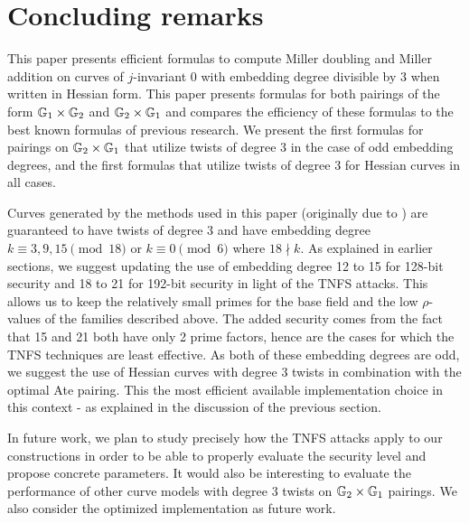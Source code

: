 \section{Concluding remarks}
\label{sec:conclude}

This paper presents efficient formulas to compute Miller doubling and Miller addition on curves of $j$-invariant 0 with embedding degree divisible by 3 when written in Hessian form.
This paper presents formulas for both pairings of the form $\mathbb{G}_{1} \times \mathbb{G}_{2}$ and $\mathbb{G}_{2} \times \mathbb{G}_{1}$ and compares the efficiency of these formulas to the best known formulas of previous research.
We present the first formulas for pairings on $\mathbb{G}_{2} \times \mathbb{G}_{1}$ that utilize twists of degree 3 in the case of odd embedding degrees, and the first formulas that utilize twists of degree 3 for Hessian curves in all cases.

Curves generated by the methods used in this paper (originally due to \cite{2010/freeman}) are guaranteed to have twists of degree $3$
and have embedding degree
$k \equiv 3,9,15 \pmod{18}$ or
$k \equiv 0 \pmod{6}$ where $18 \nmid k$.
As explained in earlier sections, we suggest updating the use of embedding degree 12 to 15 for 128-bit security and 18 to 21 for 192-bit security in light of the TNFS attacks. This allows us to keep the relatively small primes for the base field and the low $\rho$-values of the families described above. The added security comes from the fact that 15 and 21 both have only 2 prime factors, hence are the cases for which the TNFS techniques are least effective. 
As both of these embedding degrees are odd, we suggest the use of Hessian curves with degree 3 twists in combination with the optimal Ate pairing. 
This the most efficient available implementation choice in this context - as explained in the discussion of the previous section.

In future work,
we plan to study precisely how the TNFS attacks apply to our constructions in order to be able to
properly evaluate the security level and propose concrete parameters.
It would also be interesting to evaluate the performance of other curve models with degree 3 twists on $\mathbb{G}_{2} \times \mathbb{G}_{1}$ pairings.
We also consider the optimized implementation as future work.


